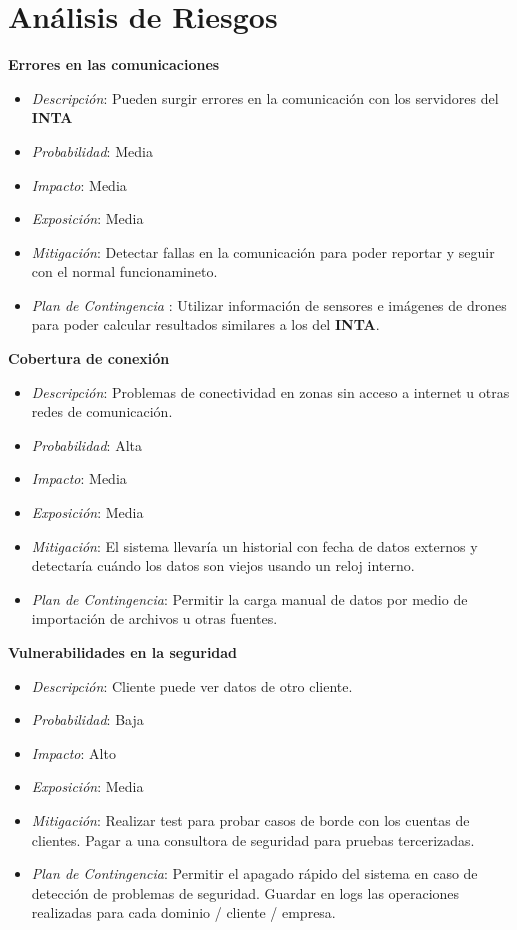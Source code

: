 \section{Análisis de Riesgos}

\textbf{Errores en las comunicaciones}
\begin{itemize}
 \item \textsl{Descripci\'on}: Pueden surgir errores en la comunicación con los servidores del \textbf{INTA}
 \item \textsl{Probabilidad}: Media
 \item \textsl{Impacto}: Media
 \item \textsl{Exposición}: Media
 \item \textsl{Mitigación}: Detectar fallas en la comunicación para poder reportar y seguir con el normal funcionamineto.
 \item \textsl{Plan de Contingencia} : Utilizar informaci\'on de sensores e imágenes de drones para poder calcular resultados similares a los del \textbf{INTA}.
\end{itemize}

\textbf{Cobertura de conexión}
\begin{itemize}
 \item \textsl{Descripci\'on}: Problemas de conectividad en zonas sin acceso a internet u otras redes de comunicación.
 \item \textsl{Probabilidad}: Alta
 \item \textsl{Impacto}: Media
 \item \textsl{Exposición}: Media
 \item \textsl{Mitigación}: El sistema llevaría un historial con fecha de datos externos y detectaría cuándo los datos son viejos usando un reloj interno.
 \item \textsl{Plan de Contingencia}: Permitir la carga manual de datos por medio de importación de archivos u otras fuentes.
\end{itemize}

\textbf{Vulnerabilidades en la seguridad}
\begin{itemize}
 \item \textsl{Descripci\'on}: Cliente puede ver datos de otro cliente.
 \item \textsl{Probabilidad}: Baja
 \item \textsl{Impacto}: Alto
 \item \textsl{Exposición}: Media
 \item \textsl{Mitigación}: Realizar test para probar casos de borde con los cuentas de clientes. Pagar a una consultora de seguridad para pruebas tercerizadas.
 \item \textsl{Plan de Contingencia}: Permitir el apagado rápido del sistema en caso de detecci\'on de problemas de seguridad. Guardar en logs las operaciones realizadas para cada dominio / cliente / empresa.
\end{itemize}

